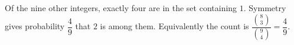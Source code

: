 Of the nine other integers, exactly four are in the set containing $1$. Symmetry gives probability $\boxed{\dfrac{4}{9}}$ that $2$ is among them. Equivalently the count is $\dfrac{\binom83}{\binom94}=\dfrac{4}{9}$.
